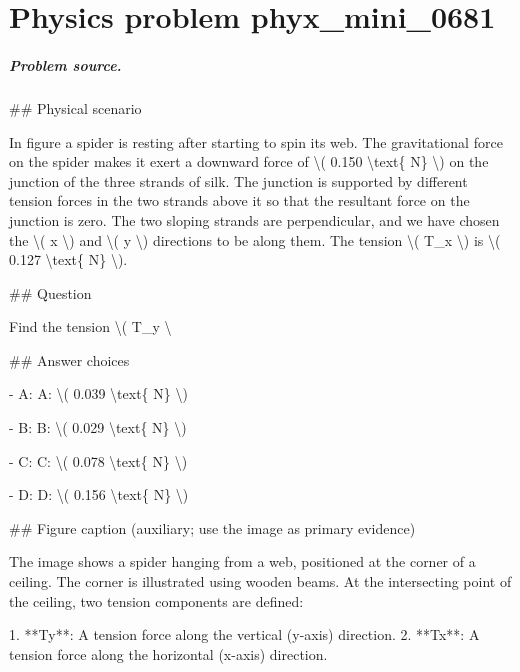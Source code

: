 
\chapter{Physics problem phyx\_mini\_0681}
\label{ch:PhyXMiniProblems_problem_phyx_mini_0681}

\paragraph{Problem source.}
\#\# Physical scenario

In figure a spider is resting after starting to spin its web. The gravitational force on the spider makes it exert a downward force of \textbackslash{}( 0.150 \textbackslash{}text\{ N\} \textbackslash{}) on the junction of the three strands of silk. The junction is supported by different tension forces in the two strands above it so that the resultant force on the junction is zero. The two sloping strands are perpendicular, and we have chosen the \textbackslash{}( x \textbackslash{}) and \textbackslash{}( y \textbackslash{}) directions to be along them. The tension \textbackslash{}( T\_x \textbackslash{}) is \textbackslash{}( 0.127 \textbackslash{}text\{ N\} \textbackslash{}).

\#\# Question

Find the tension \textbackslash{}( T\_y \textbackslash{}

\#\# Answer choices

- A: A: \textbackslash{}( 0.039 \textbackslash{}text\{ N\} \textbackslash{})

- B: B: \textbackslash{}( 0.029 \textbackslash{}text\{ N\} \textbackslash{})

- C: C: \textbackslash{}( 0.078 \textbackslash{}text\{ N\} \textbackslash{})

- D: D: \textbackslash{}( 0.156 \textbackslash{}text\{ N\} \textbackslash{})

\#\# Figure caption (auxiliary; use the image as primary evidence)

The image shows a spider hanging from a web, positioned at the corner of a ceiling. The corner is illustrated using wooden beams. At the intersecting point of the ceiling, two tension components are defined:

1. **Ty**: A tension force along the vertical (y-axis) direction.
2. **Tx**: A tension force along the horizontal (x-axis) direction.

